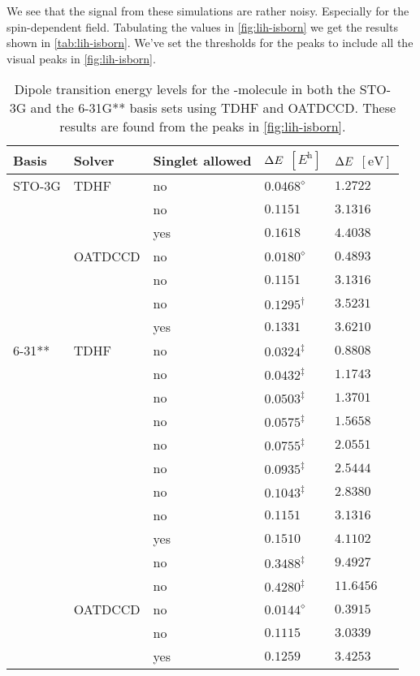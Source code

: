         We see that the signal from these simulations are rather noisy.
        Especially for the spin-dependent field.
        Tabulating the values in \autoref{fig:lih-isborn} we get the results
        shown in \autoref{tab:lih-isborn}.
        We've set the thresholds for the peaks to include all the visual peaks
        in \autoref{fig:lih-isborn}.
        \begin{table}
            \centering
            \caption{Dipole transition energy levels for the -molecule in
            both the STO-3G and the 6-31G** basis sets using TDHF and OATDCCD.
            These results are found from the peaks in \autoref{fig:lih-isborn}.}
            \renewcommand{\arraystretch}{1.3}
            \begin{tabular}{@{}lllll@{}}
                \toprule
                Basis & Solver & Singlet allowed
                & $\Delta E$ $[\si{\hartree}]$
                & $\Delta E$ $[\si{\electronvolt}]$
                \\
                \midrule
                STO-3G & TDHF & no & $0.0468^{\diamond}$ & $1.2722$ \\
                & & no & $0.1151$ & $3.1316$ \\
                & & yes & $0.1618$ & $4.4038$ \\
                & OATDCCD & no & $0.0180^{\diamond}$ & $0.4893$ \\
                & & no & $0.1151$ & $3.1316$ \\
                & & no & $0.1295^{\dagger}$ & $3.5231$ \\
                & & yes & $0.1331$ & $3.6210$ \\
                6-31** & TDHF & no & $0.0324^{\ddagger}$ & $0.8808$ \\
                & & no & $0.0432^{\ddagger}$ & $1.1743$ \\
                & & no & $0.0503^{\ddagger}$ & $1.3701$ \\
                & & no & $0.0575^{\ddagger}$ & $1.5658$ \\
                & & no & $0.0755^{\ddagger}$ & $2.0551$ \\
                & & no & $0.0935^{\ddagger}$ & $2.5444$ \\
                & & no & $0.1043^{\ddagger}$ & $2.8380$ \\
                & & no & $0.1151$ & $3.1316$ \\
                & & yes & $0.1510$ & $4.1102$ \\
                & & no & $0.3488^{\ddagger}$ & $9.4927$ \\
                & & no & $0.4280^{\ddagger}$ & $11.6456$ \\
                & OATDCCD & no & $0.0144^{\diamond}$ & $0.3915$ \\
                & & no & $0.1115$ & $3.0339$ \\
                & & yes & $0.1259$ & $3.4253$ \\
                \bottomrule
            \end{tabular}
            \label{tab:lih-isborn}
        \end{table}
